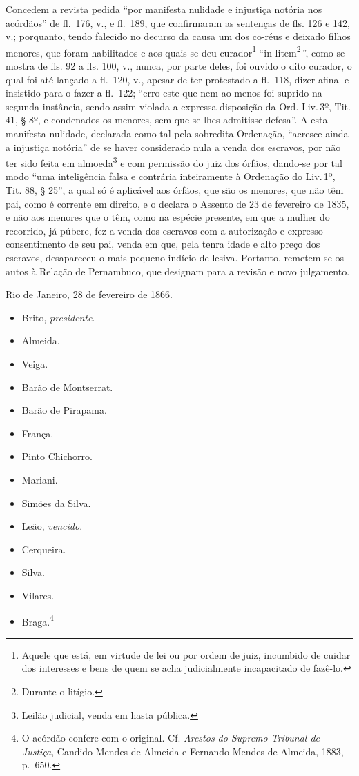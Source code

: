 Concedem a revista pedida ``por manifesta nulidade e injustiça notória
nos acórdãos'' de fl.~176, v., e fl.~189, que confirmaram as sentenças de
fls. 126 e 142, v.; porquanto, tendo falecido no decurso da causa um dos
co-réus e deixado filhos menores, que foram habilitados e aos quais se
deu curador\footnote{Aquele que está, em virtude de lei ou por ordem
  de juiz, incumbido de cuidar dos interesses e bens de quem se acha
  judicialmente incapacitado de fazê-lo.} ``in litem\footnote{Durante o
  litígio.}\emph{''}, como se mostra de fls. 92 a fls. 100, v., nunca,
por parte deles, foi ouvido o dito curador, o qual foi até lançado a
fl.~120, v., apesar de ter protestado a fl.~118, dizer afinal e
insistido para o fazer a fl.~122; ``erro este que nem ao menos foi
suprido na segunda instância, sendo assim violada a expressa disposição
da Ord. Liv.\,3º, Tit. 41, § 8º, e condenados os menores, sem que se lhes
admitisse defesa''. A esta manifesta nulidade, declarada como tal pela
sobredita Ordenação, ``acresce ainda a injustiça notória'' de se haver
considerado nula a venda dos escravos, por não ter sido feita em
almoeda\footnote{Leilão judicial, venda em hasta pública.} e com
permissão do juiz dos órfãos, dando-se por tal modo ``uma inteligência
falsa e contrária inteiramente à Ordenação do Liv.\,1º, Tit. 88, § 25'', a
qual só é aplicável aos órfãos, que são os menores, que não têm pai,
como é corrente em direito, e o declara o Assento de 23 de fevereiro de
1835, e não aos menores que o têm, como na espécie presente, em que a
mulher do recorrido, já púbere, fez a venda dos escravos com a
autorização e expresso consentimento de seu pai, venda em que, pela
tenra idade e alto preço dos escravos, desapareceu o mais pequeno
indício de lesiva. Portanto, remetem-se os autos à Relação de
Pernambuco, que designam para a revisão e novo julgamento.

Rio de Janeiro, 28 de fevereiro de 1866.

\begin{itemize}
\tightlist
\item
  Brito, \emph{presidente}.
\item
  Almeida.
\item
  Veiga.
\item
  Barão de Montserrat.
\item
  Barão de Pirapama.
\item
  França.
\item
  Pinto Chichorro.
\item
  Mariani.
\item
  Simões da Silva.
\item
  Leão, \emph{vencido}.
\item
  Cerqueira.
\item
  Silva.
\item
  Vilares.
\item
  Braga.\footnote{O acórdão confere com o original. Cf. \emph{Arestos
    do Supremo Tribunal de Justiça}, Candido Mendes de Almeida e
    Fernando Mendes de Almeida, 1883, p.~650.}
\end{itemize}

